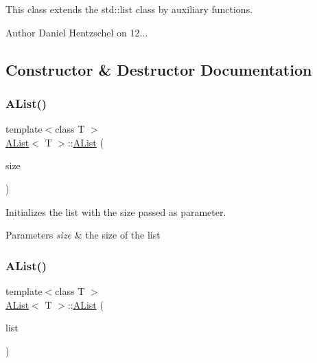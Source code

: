 This class extends the std\+::list class by auxiliary functions. 

\begin{DoxyAuthor}{Author}
Daniel Hentzschel on 12... 
\end{DoxyAuthor}


\subsection{Constructor \& Destructor Documentation}
\mbox{\label{class_a_list_a8cec560bb9216051a7f2ba0676d6aabf}} 
\subsubsection{\texorpdfstring{AList()}{AList()}\hspace{0.1cm}{\footnotesize\ttfamily [1/3]}}
{\footnotesize\ttfamily template$<$class T $>$ \\
\mbox{\hyperlink{class_a_list}{A\+List}}$<$ T $>$\+::\mbox{\hyperlink{class_a_list}{A\+List}} (\begin{DoxyParamCaption}\item[{int64}]{size }\end{DoxyParamCaption})\hspace{0.3cm}{\ttfamily [explicit]}}



Initializes the list with the size passed as parameter. 


\begin{DoxyParams}{Parameters}
{\em size} & the size of the list \\
\hline
\end{DoxyParams}
\mbox{\label{class_a_list_a6009559ea4861f2a9263e447485dfeb2}} 
\subsubsection{\texorpdfstring{AList()}{AList()}\hspace{0.1cm}{\footnotesize\ttfamily [2/3]}}
{\footnotesize\ttfamily template$<$class T $>$ \\
\mbox{\hyperlink{class_a_list}{A\+List}}$<$ T $>$\+::\mbox{\hyperlink{class_a_list}{A\+List}} (\begin{DoxyParamCaption}\item[{const \mbox{\hyperlink{class_a_list}{A\+List}}$<$ T $>$ \&}]{list }\end{DoxyParamCaption})}



